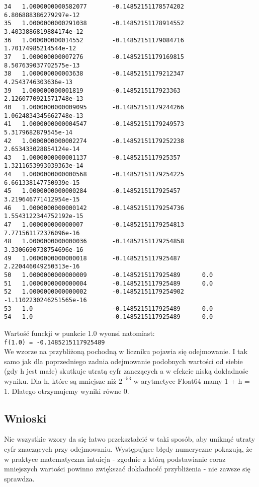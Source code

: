 \documentclass{article}
\begin{document}
\begin{verbatim}
34   1.0000000000582077       -0.14852151178574202     6.806888386279297e-12
35   1.0000000000291038       -0.14852151178914552     3.4033886819884174e-12
36   1.000000000014552        -0.14852151179084716     1.70174985214544e-12
37   1.000000000007276        -0.14852151179169815     8.507639037702575e-13
38   1.000000000003638        -0.14852151179212347     4.2543746303636e-13
39   1.000000000001819        -0.1485215117923363      2.1260770921571748e-13
40   1.0000000000009095       -0.14852151179244266     1.0624834345662748e-13
41   1.0000000000004547       -0.14852151179249573     5.3179682879545e-14
42   1.0000000000002274       -0.14852151179252238     2.653433028854124e-14
43   1.0000000000001137       -0.1485215117925357      1.3211653993039363e-14
44   1.0000000000000568       -0.14852151179254225     6.661338147750939e-15
45   1.0000000000000284       -0.1485215117925457      3.219646771412954e-15
46   1.0000000000000142       -0.14852151179254736     1.5543122344752192e-15
47   1.000000000000007        -0.14852151179254813     7.771561172376096e-16    
48   1.0000000000000036       -0.14852151179254858     3.3306690738754696e-16
49   1.0000000000000018       -0.1485215117925487      2.220446049250313e-16
50   1.0000000000000009       -0.1485215117925489      0.0
51   1.0000000000000004       -0.1485215117925489      0.0
52   1.0000000000000002       -0.14852151179254902     -1.1102230246251565e-16
53   1.0                      -0.1485215117925489      0.0
54   1.0                      -0.1485215117925489      0.0
\end{verbatim}
Wartość funckji w punkcie 1.0 wyonsi natomiast:\\ \texttt{f(1.0) = -0.1485215117925489}\\
We wzorze na przybliżoną pochodną w liczniku pojawia się odejmowanie. I tak samo jak dla poprzedniego zadnia odejmowanie podobnych wartości od siebie (gdy h jest małe) skutkuje utratą cyfr zanczących a w efekcie niską dokładnośc wyniku. Dla h, które są mniejsze niż $2^{-53}$ w arytmetyce Float64 mamy 1 + h = 1. Dlatego otrzymujemy wyniki równe 0.
\subsection*{Wnioski}
Nie wszystkie wzory da się łatwo przekształcić w taki sposób, aby uniknąć utraty cyfr znaczących przy odejmowaniu. Występujące błędy numeryczne pokazują, że w praktyce matematyczna intuicja - zgodnie z którą podstawianie coraz mniejszych wartości powinno zwiększać dokładność przybliżenia - nie zawsze się sprawdza.
\end{document}
